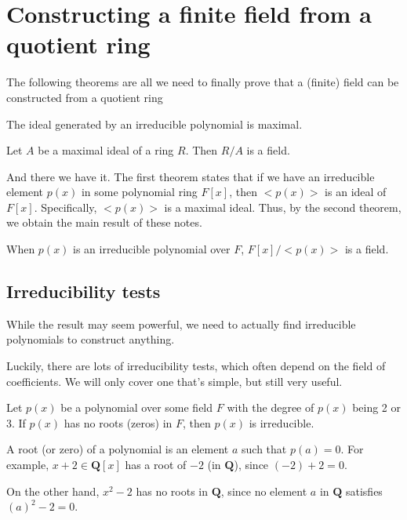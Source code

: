 \section{Constructing a finite field from a quotient ring}

The following theorems are all we need to finally prove that a (finite) field can be constructed from a quotient ring

\begin{theorem}
The ideal generated by an irreducible polynomial is maximal.
\end{theorem}

\begin{theorem}
Let $A$ be a maximal ideal of a ring $R$. Then $R/A$ is a field.
\end{theorem}

And there we have it. The first theorem states that if we have an irreducible element $p(x)$ in some polynomial ring $F[x]$, then $<p(x)>$ is an ideal of $F[x]$. Specifically, $<p(x)>$ is a maximal ideal. Thus, by the second theorem, we obtain the main result of these notes.

\begin{result}
When $p(x)$ is an irreducible polynomial over $F$, $F[x]/<p(x)>$ is a field. 
\end{result}

\subsection{Irreducibility tests}
While the result may seem powerful, we need to actually find irreducible polynomials to construct anything.

Luckily, there are lots of irreducibility tests, which often depend on the field of coefficients. We will only cover one that's simple, but still very useful.

\begin{theorem}
Let $p(x)$ be a polynomial over some field $F$ with the degree of $p(x)$ being 2 or 3. If $p(x)$ has no roots (zeros) in $F$, then $p(x)$ is irreducible. 
\end{theorem}

A root (or zero) of a polynomial is an element $a$ such that $p(a) = 0$. For example, $x+2 \in \mathbf{Q}[x]$ has a root of $-2$ (in $\mathbf{Q}$), since $(-2) + 2 = 0$. 

On the other hand, $x^2 - 2$ has no roots in $\mathbf{Q}$, since no element $a$ in $\mathbf{Q}$ satisfies $(a)^2 - 2 = 0$.


